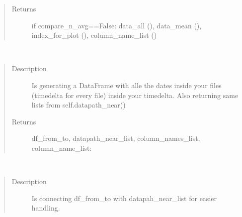 \documentclass[letterpaper,10pt,english]{sphinxmanual}
\begin{document}
\begin{fulllineitems}
\begin{fulllineitems}
\begin{quote}
\begin{description}
\item[{Returns}] \leavevmode
\sphinxAtStartPar
if compare\_n\_avg==False: data\_all (), data\_mean (), index\_for\_plot (), column\_name\_list ()

\end{description}\end{quote}

\end{fulllineitems}


\begin{fulllineitems}
\label{\detokenize{DwdNearNeighbor:DwdNearNeighbor.NearNeighbor.dataframe_near_from_to}}~\begin{quote}\begin{description}
\item[{Description}] \leavevmode
\sphinxAtStartPar
Is generating a DataFrame with alle the dates inside your files (timedelta for every file) inside your timedelta. Also returning same lists from self.datapath\_near()

\item[{Returns}] \leavevmode
\sphinxAtStartPar
df\_from\_to, datapath\_near\_list, column\_names\_list, column\_name\_list: 

\end{description}\end{quote}

\end{fulllineitems}


\begin{fulllineitems}
\label{\detokenize{DwdNearNeighbor:DwdNearNeighbor.NearNeighbor.dataframe_near_from_to_path}}~\begin{quote}\begin{description}
\item[{Description}] \leavevmode
\sphinxAtStartPar
Is connecting df\_from\_to with datapah\_near\_list for easier handling.


\end{description}
\end{quote}
\end{fulllineitems}
\end{fulllineitems}
\end{document}
